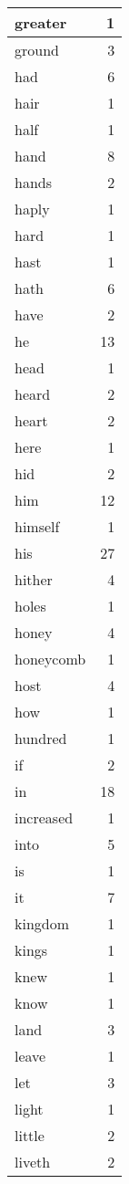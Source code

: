 \begin{center}
\begin{longtable}{l|r}
greater & 1 \\ \hline
ground & 3 \\ \hline
had & 6 \\ \hline
hair & 1 \\ \hline
half & 1 \\ \hline
hand & 8 \\ \hline
hands & 2 \\ \hline
haply & 1 \\ \hline
hard & 1 \\ \hline
hast & 1 \\ \hline
hath & 6 \\ \hline
have & 2 \\ \hline
he & 13 \\ \hline
head & 1 \\ \hline
heard & 2 \\ \hline
heart & 2 \\ \hline
here & 1 \\ \hline
hid & 2 \\ \hline
him & 12 \\ \hline
himself & 1 \\ \hline
his & 27 \\ \hline
hither & 4 \\ \hline
holes & 1 \\ \hline
honey & 4 \\ \hline
honeycomb & 1 \\ \hline
host & 4 \\ \hline
how & 1 \\ \hline
hundred & 1 \\ \hline
if & 2 \\ \hline
in & 18 \\ \hline
increased & 1 \\ \hline
into & 5 \\ \hline
is & 1 \\ \hline
it & 7 \\ \hline
kingdom & 1 \\ \hline
kings & 1 \\ \hline
knew & 1 \\ \hline
know & 1 \\ \hline
land & 3 \\ \hline
leave & 1 \\ \hline
let & 3 \\ \hline
light & 1 \\ \hline
little & 2 \\ \hline
liveth & 2 \\ \hline

\end{longtable}
\end{center}
